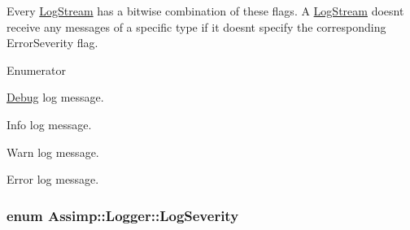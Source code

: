Every \hyperlink{class_assimp_1_1_log_stream}{Log\+Stream} has a bitwise combination of these flags. A \hyperlink{class_assimp_1_1_log_stream}{Log\+Stream} doesn\textquotesingle{}t receive any messages of a specific type if it doesn\textquotesingle{}t specify the corresponding Error\+Severity flag. \begin{Desc}
\item[Enumerator]\par
\begin{description}
\item[{\em 
Debugging\hypertarget{class_assimp_1_1_logger_acd0b52a87d6fc11e957ed2c6e2ad75b6a0cb475014d27098c3423738c571d857f}{}\label{class_assimp_1_1_logger_acd0b52a87d6fc11e957ed2c6e2ad75b6a0cb475014d27098c3423738c571d857f}
}]\hyperlink{class_debug}{Debug} log message. \item[{\em 
Info\hypertarget{class_assimp_1_1_logger_acd0b52a87d6fc11e957ed2c6e2ad75b6aa3377a574928b86f7de55c5df154f461}{}\label{class_assimp_1_1_logger_acd0b52a87d6fc11e957ed2c6e2ad75b6aa3377a574928b86f7de55c5df154f461}
}]Info log message. \item[{\em 
Warn\hypertarget{class_assimp_1_1_logger_acd0b52a87d6fc11e957ed2c6e2ad75b6a1279c77aaee5a3d7df835a9b9305a697}{}\label{class_assimp_1_1_logger_acd0b52a87d6fc11e957ed2c6e2ad75b6a1279c77aaee5a3d7df835a9b9305a697}
}]Warn log message. \item[{\em 
Err\hypertarget{class_assimp_1_1_logger_acd0b52a87d6fc11e957ed2c6e2ad75b6a71054d0b1323abcea46d050d69013d27}{}\label{class_assimp_1_1_logger_acd0b52a87d6fc11e957ed2c6e2ad75b6a71054d0b1323abcea46d050d69013d27}
}]Error log message. \end{description}
\end{Desc}
\subsubsection[{\texorpdfstring{Log\+Severity}{LogSeverity}}]{\setlength{\rightskip}{0pt plus 5cm}enum {\bf Assimp\+::\+Logger\+::\+Log\+Severity}}\hypertarget{class_assimp_1_1_logger_a8b6248a0fd062431e8572556350d29e6}{}\label{class_assimp_1_1_logger_a8b6248a0fd062431e8572556350d29e6}


